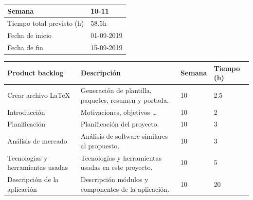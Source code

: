 \begin{table}[h!]
\centering
\begin{tabular}{|p{5cm}|p{4cm}|}
 \hline
	\cellcolor[gray]{0.9} Semana  & 10-11\\ \hline
	\cellcolor[gray]{0.9} Tiempo total previsto (h)  & 58.5h \\ \hline
	\cellcolor[gray]{0.9} Fecha de inicio  & 01-09-2019 \\ \hline
	\cellcolor[gray]{0.9} Fecha de fin  & 15-09-2019 \\ \hline
		
\end{tabular}
\end{table}

\begin{table}[h!]
\begin{tabular}{|p{4cm}|p{7.2cm}|p{1.3cm}|p{2.1cm}|}
\hline
\rowcolor[HTML]{9B9B9B} 
{\color[HTML]{FFFFFF} Product backlog} & {\color[HTML]{FFFFFF} Descripción}                                  & {\color[HTML]{FFFFFF} Semana} & {\color[HTML]{FFFFFF}Tiempo (h)} \\ \hline

Crear archivo LaTeX                          & Generación de plantilla, paquetes, resumen y portada.
                                        & 10                            & 2.5                                   \\ \hline
          
Introducción                        &   Motivaciones, objetivos \ldots
          & 10                              & 2                                   \\ \hline

Planificación & Planificación del proyecto.
          & 10                              & 3                                   \\ \hline

Análisis de mercado                        & Análisis de software similares al propuesto.
          & 10                             & 3                                  \\ \hline
        
Tecnologías y herramientas usadas                        & Tecnologías y herramientas usadas en este proyecto.
          & 10                              & 5                                  \\ \hline

        
Descripción de la aplicación                        & Descripción módulos y componentes de la aplicación.
          & 10                              & 20                                  \\ \hline
          

\end{tabular}
\end{table}
